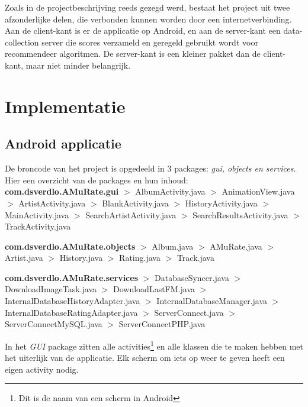 \documentclass[11pt,a4paper]{article}
\newcommand{\pack}[1]{$>$ #1.java \newline}
\begin{document}
	Zoals in de projectbeschrijving reeds gezegd werd, bestaat het project uit twee afzonderlijke delen, die verbonden kunnen worden door een internetverbinding. Aan de client-kant is er de applicatie op Android, en aan de server-kant een data-collection server die scores verzameld en geregeld gebruikt wordt voor recommendeer algoritmen. De server-kant is een kleiner pakket dan de client-kant, maar niet minder belangrijk. 
	\\ \newline



\newpage %
\section{Implementatie}
\label{sec:Implementatie}

	\subsection{Android applicatie}
	\label{sec:Android applicatie}	
		\normalsize  
		De broncode van het project is opgedeeld in 3 packages: \textit{gui, objects en services}. Hier een overzicht van de packages en hun inhoud:\\
		
		 \textbf{com.dsverdlo.AMuRate.gui} \newline		
		 \pack{AlbumActivity}
		 \pack{AnimationView}
		 \pack{ArtistActivity}
		 \pack{BlankActivity}
		 \pack{HistoryActivity}
		 \pack{MainActivity}
		 \pack{SearchArtistActivity}
		 \pack{SearchResultsActivity} 
		 \pack{TrackActivity}
		 
		\textbf{com.dsverdlo.AMuRate.objects} \newline
		\pack{Album}
		\pack{AMuRate}
		\pack{Artist}
		\pack{History}
		\pack{Rating}
		\pack{Track}
		
		\textbf{com.dsverdlo.AMuRate.services} \newline
		\pack{DatabaseSyncer}
		\pack{DownloadImageTask}
		\pack{DownloadLastFM}
		\pack{InternalDatabaseHistoryAdapter}
		\pack{InternalDatabaseManager}
		\pack{InternalDatabaseRatingAdapter}
		\pack{ServerConnect}
		\pack{ServerConnectMySQL}
		\pack{ServerConnectPHP}
		
		 In het \textit{GUI} package zitten alle activities\footnote{Dit is de naam van een scherm in Android} en alle klassen die te maken hebben met het uiterlijk van de applicatie. Elk scherm om iets op weer te geven heeft een eigen activity nodig. \\
		 
\end{document}
